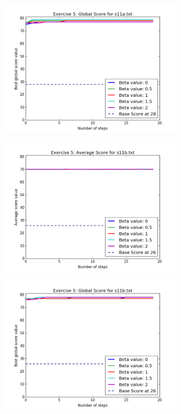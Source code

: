 \documentclass[a4paper]{article}
\begin{document}
\begin{enumerate}
\begin{enumerate}
    	\begin{figure}[H]
        	\centering
          	\includegraphics[width=0.8\textwidth]{images/best_s11a.png}
    	\end{figure}
    	
    	    	\begin{figure}[H]
        	\centering
          	\includegraphics[width=0.8\textwidth]{images/average_s11b.png}
    	\end{figure}	
    	
    	\begin{figure}[H]
        	\centering
          	\includegraphics[width=0.8\textwidth]{images/best_s11b.png}
    	\end{figure}
		

\end{enumerate}
\end{enumerate}
\end{document}
